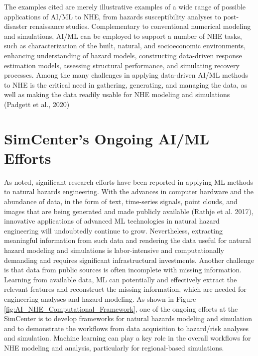 The examples cited are merely illustrative examples of a wide range of possible applications of AI/ML to NHE, from hazards susceptibility analyses to post-disaster renaissance studies. Complementary to conventional numerical modeling and simulations, AI/ML can be employed to support a number of NHE tasks, such as characterization of the built, natural, and socioeconomic environments, enhancing understanding of hazard models, constructing data-driven response estimation models, assessing structural performance, and simulating recovery processes. Among the many challenges in applying data-driven AI/ML methods to NHE is the critical need in gathering, generating, and managing the data, as well as making the data readily usable for NHE modeling and simulations (Padgett et al., 2020)

\section{SimCenter's Ongoing AI/ML Efforts}
\label{sec:ai_simcenter}

As noted, significant research efforts have been reported in applying ML methods to natural hazards engineering. With the advances in computer hardware and the abundance of data, in the form of text, time-series signals, point clouds, and images that are being generated and made publicly available (Rathje et al. 2017), innovative applications of advanced ML technologies in natural hazard engineering will undoubtedly continue to grow. Nevertheless, extracting meaningful information from such data and rendering the data useful for natural hazard modeling and simulations is labor-intensive and computationally demanding and requires significant infrastructural investments. Another challenge is that data from public sources is often incomplete with missing information. Learning from available data, ML can potentially and effectively extract the relevant features and reconstruct the missing information, which are needed for engineering analyses and hazard modeling. As shown in Figure \ref{fig:AI_NHE_Computational_Framework}, one of the ongoing efforts at the SimCenter is to develop frameworks for natural hazards modeling and simulation and to demonstrate the workflows from data acquisition to hazard/risk analyses and simulation. Machine learning can play a key role in the overall workflows for NHE modeling and analysis, particularly for regional-based simulations. 

